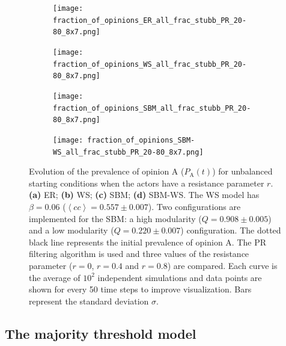 \documentclass[11 pt , letterpaper , twoside , openright]{book}
\begin{document}
\begin{figure}[H]
  \begin{subfigure}[b]{0.49\textwidth}
    \caption{}
  	\texttt{[image: fraction\_of\_opinions\_ER\_all\_frac\_stubb\_PR\_20-80\_8x7.png]}
  \end{subfigure}
  \begin{subfigure}[b]{0.49\textwidth}
    \caption{}
  	\texttt{[image: fraction\_of\_opinions\_WS\_all\_frac\_stubb\_PR\_20-80\_8x7.png]}
  \end{subfigure}
  \begin{subfigure}[b]{0.49\textwidth}
    \caption{}
    \texttt{[image: fraction\_of\_opinions\_SBM\_all\_frac\_stubb\_PR\_20-80\_8x7.png]}
  \end{subfigure}
  \begin{subfigure}[b]{0.49\textwidth}
    \caption{}
    \texttt{[image: fraction\_of\_opinions\_SBM-WS\_all\_frac\_stubb\_PR\_20-80\_8x7.png]}
  \end{subfigure}
  \captionsetup{format=plain}
  \caption[Evolution of the prevalence of opinion A ($P_\text{A}(t)$) for unbalanced starting conditions when the actors have a resistance parameter $r$. The PR filtering algorithm is used and three values of the resistance parameter $r$ ($r = 0$, $r = 0.4$ and $r = 0.8$) are compared.]{Evolution of the prevalence of opinion A ($P_\text{A}(t)$) for unbalanced starting conditions when the actors have a resistance parameter $r$. \textbf{(a)} ER; \textbf{(b)} WS; \textbf{(c)} SBM; \textbf{(d)} SBM-WS. The WS model has $\beta = 0.06$ ($\left<cc\right> = 0.557 \pm 0.007$). Two configurations are implemented for the SBM: a high modularity ($Q = 0.908 \pm 0.005$) and a low modularity ($Q = 0.220 \pm 0.007$) configuration. The dotted black line represents the initial prevalence of opinion A. The PR filtering algorithm is used and three values of the resistance parameter ($r = 0$, $r = 0.4$ and $r = 0.8$) are compared. Each curve is the average of $10^2$ independent simulations and data points are shown for every 50 time steps to improve visualization. Bars represent the standard deviation $\sigma$.}
\label{ev_op_20_80_all_frac_stubb_PR}
\end{figure}

\subsection{The majority threshold model}
\label{majThres}
\end{document}

